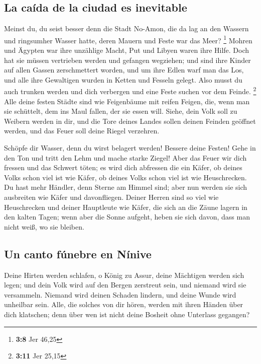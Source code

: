 \hypertarget{la-cauxedda-de-la-ciudad-es-inevitable}{%
\subsection{La caída de la ciudad es
inevitable}\label{la-cauxedda-de-la-ciudad-es-inevitable}}

 Meinst du, du seist besser denn die Stadt No-Amon, die da
lag an den Wassern und ringsumher Wasser hatte, deren Mauern und Feste
war das Meer? \footnote{\textbf{3:8} Jer 46,25}  Mohren
und Ägypten war ihre unzählige Macht, Put und Libyen waren ihre Hilfe.
 Doch hat sie müssen vertrieben werden und gefangen
wegziehen; und sind ihre Kinder auf allen Gassen zerschmettert worden,
und um ihre Edlen warf man das Los, und alle ihre Gewaltigen wurden in
Ketten und Fesseln gelegt.  Also musst du auch trunken
werden und dich verbergen und eine Feste suchen vor dem Feinde.
\footnote{\textbf{3:11} Jer 25,15}  Alle deine festen
Städte sind wie Feigenbäume mit reifen Feigen, die, wenn man sie
schüttelt, dem ins Maul fallen, der sie essen will. 
Siehe, dein Volk soll zu Weibern werden in dir, und die Tore deines
Landes sollen deinen Feinden geöffnet werden, und das Feuer soll deine
Riegel verzehren.

 Schöpfe dir Wasser, denn du wirst belagert werden!
Bessere deine Festen! Gehe in den Ton und tritt den Lehm und mache
starke Ziegel!  Aber das Feuer wir dich fressen und das
Schwert töten; es wird dich abfressen die ein Käfer, ob deines Volks
schon viel ist wie Käfer, ob deines Volks schon viel ist wie
Heuschrecken.  Du hast mehr Händler, denn Sterne am
Himmel sind; aber nun werden sie sich ausbreiten wie Käfer und
davonfliegen.  Deiner Herren sind so viel wie
Heuschrecken und deiner Hauptleute wie Käfer, die sich an die Zäune
lagern in den kalten Tagen; wenn aber die Sonne aufgeht, heben sie sich
davon, dass man nicht weiß, wo sie bleiben.

\hypertarget{un-canto-fuxfanebre-en-nuxednive}{%
\subsection{Un canto fúnebre en
Nínive}\label{un-canto-fuxfanebre-en-nuxednive}}

 Deine Hirten werden schlafen, o König zu Assur, deine
Mächtigen werden sich legen; und dein Volk wird auf den Bergen zerstreut
sein, und niemand wird sie versammeln.  Niemand wird
deinen Schaden lindern, und deine Wunde wird unheilbar sein. Alle, die
solches von dir hören, werden mit ihren Händen über dich klatschen; denn
über wen ist nicht deine Bosheit ohne Unterlass gegangen?
